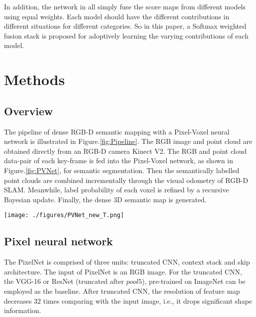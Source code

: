 \documentclass[letterpaper, 10 pt, conference]{ieeeconf}
\begin{document}
In addition, the network in \cite{long2015fully}\cite{hazirbas2016fusenet}\cite{li2016lstm} all simply fuse the score maps from different models using equal weights. Each model should have the different contributions in different situations for different categories. So in this paper, a Softmax weighted fusion stack is proposed for adoptively learning the varying contributions of each model. 
\section{Methods}\label{sec:3}
  
\subsection{Overview}\label{sec:3.1}
The pipeline of dense RGB-D semantic mapping with a Pixel-Voxel neural network is illustrated in Figure.\ref{fig:Pipeline}. The RGB image and point cloud are obtained directly from an RGB-D camera Kinect V2. The RGB and point cloud data-pair of each key-frame is fed into the Pixel-Voxel network, as shown in Figure.\ref{fig:PVNet}, for semantic segmentation. Then the semantically labelled point clouds are combined incrementally through the visual odometry of RGB-D SLAM. Meanwhile, label probability of each voxel is refined by a recursive Bayesian update. Finally, the dense 3D semantic map is generated.
 
\begin{figure*}[thpb]
	\centering
	\texttt{[image: ./figures/PVNet\_new\_T.png]}
	\caption{\textbf{The architecture of the Pixel-Voxel Network.} The PixelNet comprises three units: truncated CNN, context stack and skip architecture. The VoxelNet is composed of the convolution stacks, local and global information combination stack and reshape layer. It obtains global context information through PixelNet and meanwhile, preserves accurate local shape information through VoxelNet. The Softmax weighted fusion stack can fuse 3 score maps from PixelNet and VoxelNet together according to their respective confidence levels in different situations.}
	\label{fig:PVNet}
\end{figure*}

\subsection{Pixel neural network}\label{sec:3.2}
The PixelNet is comprised of three units: truncated CNN, context stack and skip architecture. The input of PixelNet is an RGB image. For the truncated CNN, the VGG-16 or ResNet (truncated after $pool5$), pre-trained on ImageNet can be employed as the baseline. After truncated CNN, the resolution of feature map decreases $32$ times comparing with the input image, i.e., it drops significant shape information.
\end{document}
